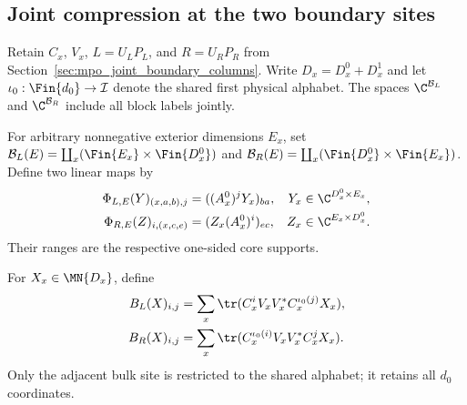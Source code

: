 
\subsection{Joint compression at the two boundary sites}
\label{sec:mpo_joint_edge_normalization}

Retain $C_x$, $V_x$, $L=U_LP_L$, and $R=U_RP_R$ from
Section~\ref{sec:mpo_joint_boundary_columns}. Write $D_x=D_x^0+D_x^1$
and let $\iota_0:\Fin{d_0}\to\mathcal I$ denote the shared first physical
alphabet. The spaces $\C^{\mathcal B_L}$ and $\C^{\mathcal B_R}$ include
all block labels jointly.

\begin{definition}
    \label{def:mpo_joint_edge_cores}
    \leanok
    For arbitrary nonnegative exterior dimensions $E_x$, set
    $\mathcal B_L(E)=\coprod_x(\Fin{E_x}\times\Fin{D_x^0})$ and
    $\mathcal B_R(E)=\coprod_x(\Fin{D_x^0}\times\Fin{E_x})$.
    Define two linear maps by
    \begin{align}
        \Phi_{L,E}(Y)_{(x,a,b),j} & =((A_x^0)^jY_x)_{ba},
                                  & Y_x                   & \in\C^{D_x^0\times E_x}, \\
        \Phi_{R,E}(Z)_{i,(x,c,e)} & =(Z_x(A_x^0)^i)_{ec},
                                  & Z_x                   & \in\C^{E_x\times D_x^0}.
    \end{align}
    Their ranges are the respective one-sided core supports.
\end{definition}

\begin{definition}
    \label{def:mpo_joint_cropped_edges}
    \leanok
    For $X_x\in\MN{D_x}$, define
    \begin{align}
        B_L(X)_{i,j} & =\sum_x\tr(C_x^iV_xV_x^*C_x^{\iota_0(j)}X_x), \\
        B_R(X)_{i,j} & =\sum_x\tr(C_x^{\iota_0(i)}V_xV_x^*C_x^jX_x).
    \end{align}
    Only the adjacent bulk site is restricted to the shared alphabet;
    it retains all $d_0$ coordinates.
\end{definition}

